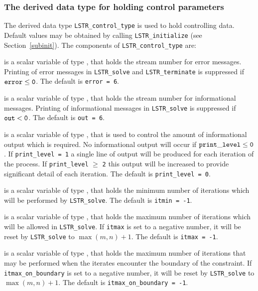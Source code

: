 \documentclass{galahad}
\newcommand{\packagename}{LS\-TR}
\begin{document}
\subsubsection{The derived data type for holding control
 parameters}\label{typecontrol}
The derived data type
{\tt \packagename\_control\_type}
is used to hold controlling data. Default values may be obtained by calling
{\tt \packagename\_initialize}
(see Section~\ref{subinit}). The components of
{\tt \packagename\_control\_type}
are:

\begin{description}
 is a scalar variable of type \integer, that holds the
stream number for error messages.
Printing of error messages in
{\tt \packagename\_solve} and {\tt \packagename\_terminate}
is suppressed if ${\tt error} \leq {\tt 0}$.
The default is {\tt error = 6}.

 is a scalar variable of type \integer, that holds the
stream number for informational messages.
Printing of informational messages in
{\tt \packagename\_solve} is suppressed if ${\tt out} < {\tt 0}$.
The default is {\tt out = 6}.

 is a scalar variable of type \integer,
that is used
to control the amount of informational output which is required. No
informational output will occur if ${\tt print\_level} \leq {\tt 0}$. If
{\tt print\_level = 1} a single line of output will be produced for each
iteration of the process. If {\tt print\_level} $\geq$ {\tt 2} this output
will be increased to provide significant detail of each iteration.
The default is {\tt print\_level = 0}.

 is a scalar variable of type \integer, that holds the
minimum number of iterations which will be performed by
{\tt \packagename\_solve}.
The default is {\tt itmin = -1}.

 is a scalar variable of type \integer, that holds the
maximum number of iterations which will be allowed in
{\tt \packagename\_solve}.
If {\tt itmax} is set to a negative number, it will be reset by
{\tt \packagename\_solve} to $\max(m,n)+1$.
The default is {\tt itmax = -1}.

 is a scalar variable of type \integer,
that holds the
maximum number of iterations that may be performed when the iterates
encounter the boundary of the constraint.
If {\tt itmax\_on\_boundary} is set to a negative number, it will be reset by
{\tt \packagename\_solve} to $\max(m,n)+1$.
The default is {\tt itmax\_on\_boundary = -1}.


\end{description}
\end{document}

